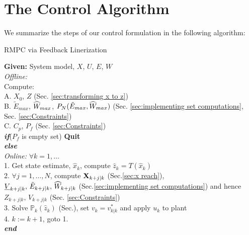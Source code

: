 \section{The Control Algorithm}

We summarize the steps of our control formulation in the following algorithm:

\begin{algorithm}
\caption{RMPC via Feedback Linerization}
\textbf{Given:} System model, $X$, $U$, $E$, $W$ \\
\textit{Offline:} \\
Compute: \\
A.  $X_0$, $Z$ (Sec. \ref{sec:transforming x to z})\\
B. $\tilde{E}_{max}$, $\widehat{W}_{max}$, $P_N(\tilde{E}_{max},\widehat{W}_{max})$ (Sec. \ref{sec:implementing set computations}, Sec. \ref{sec:Constraints}) \\
C. $C_p$, $P_f$ (Sec. \ref{sec:Constraints})\\
\textit{\textbf{if}}($P_f$ is empty set) \textbf{Quit} \\
\textit{\textbf{else}} \\
\textit{Online:} $\forall k=1,\dotsc$ \\
1. Get state estimate, $\hat{x}_k$, compute $\hat{z}_k = T(\hat{x}_k)$ \\
2. $\forall j = 1,\dotsc,N$, compute $\mathbf{X}_{k+j|k}$ (Sec.\ref{sec:x reach}), \\
 $\underline{V}_{k+j|k},\,\tilde{E}_{k+j|k},\, \widehat{W}_{k+j|k}$ (Sec.\ref{sec:implementing set computations}) and hence \\
$Z_{k+j|k},\,V_{k+j|k}$ (Sec. \ref{sec:Constraints})\\
3. Solve $\mathbb{P}_k(\hat{z}_k)$ (Sec.), set $v_k = v^{*}_{k|k}$ and apply $u_k$ to plant \\
4. $k:=k+1$, goto 1. \\
\textit{\textbf{end}}
\label{alg:RMPC}
\end{algorithm}